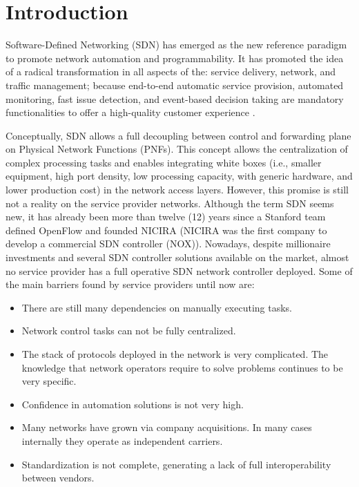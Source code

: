 \documentclass[10pt, conference]{IEEEtran}
\begin{document}

\section{Introduction}
Software-Defined Networking (SDN) has emerged as the new reference paradigm to promote network automation and programmability. It has promoted the idea of a radical transformation in all aspects of the: service delivery, network, and traffic management; because end-to-end automatic service provision, automated monitoring, fast issue detection, and event-based decision taking are mandatory functionalities to offer a high-quality customer experience \cite{ordonez2017network}.

Conceptually, SDN allows a full decoupling between control and forwarding plane on Physical Network Functions (PNFs). 
This concept allows the centralization of complex processing tasks and enables integrating white boxes (i.e., smaller equipment, high port density, low processing capacity,  with generic hardware, and lower production cost) in the network access layers. However, this promise is still not a reality on the service provider networks. Although the term SDN seems new, it has already been more than twelve (12) years since a Stanford team defined OpenFlow and founded NICIRA (NICIRA was the first company to develop a commercial SDN controller (NOX)). Nowadays, despite millionaire investments and several SDN controller solutions available \cite{medved2014opendaylight,berde2014onos} on the market, almost no service provider has a full operative SDN network controller deployed. Some of the main barriers found by service providers until now are:

\begin{itemize}
    \item There are still many dependencies on manually executing tasks.
    \item Network control tasks can not be fully centralized.
    \item The stack of protocols deployed in the network is very complicated.  The knowledge that network operators require to solve problems continues to be very specific.
    \item Confidence in automation solutions is not very high.
    \item Many networks have grown via company acquisitions. In many cases internally they operate as independent carriers. 
    \item Standardization is not complete, generating a lack of full interoperability between vendors.
\end{itemize}
\end{document}
